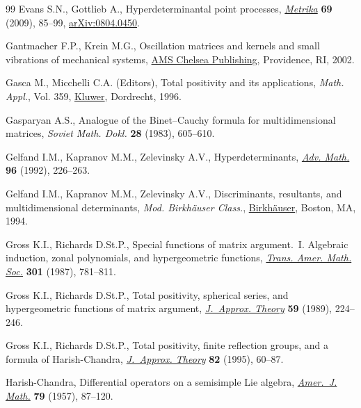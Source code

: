 \documentclass[10pt,a4paper]{amsart}
\numberwithin{equation}{section}
\begin{document}
\begin{thebibliography}{99}
Evans S.N., Gottlieb A., Hyperdeterminantal point processes,
 \href{https://doi.org/10.1007/s00184-008-0209-0}{\textit{Metrika}}
 \textbf{69} (2009), 85--99,
 \href{http://arxiv.org/abs/0804.0450}{arXiv:0804.0450}.

Gantmacher F.P., Krein M.G., Oscillation matrices and kernels and small
 vibrations of mechanical systems, \href{https://doi.org/10.1090/chel/345}{AMS
 Chelsea Publishing}, Providence, RI, 2002.

Gasca M., Micchelli C.A. (Editors), Total positivity and its applications,
 \textit{Math. Appl.}, Vol. 359,
 \href{https://doi.org/10.1007/978-94-015-8674-0}{Kluwer}, Dordrecht, 1996.

Gasparyan A.S., Analogue of the {B}inet--{C}auchy formula for multidimensional
 matrices, \textit{Soviet Math. Dokl.} \textbf{28} (1983), 605--610.

Gelfand I.M., Kapranov M.M., Zelevinsky A.V., Hyperdeterminants,
 \href{https://doi.org/10.1016/0001-8708(92)90056-Q}{\textit{Adv. Math.}}
 \textbf{96} (1992), 226--263.

Gelfand I.M., Kapranov M.M., Zelevinsky A.V., Discriminants, resultants, and
 multidimensional determinants, \textit{Mod. Birkh\"auser Class.},
 \href{https://doi.org/10.1007/978-0-8176-4771-1}{Birkh\"auser}, Boston, MA,
 1994.

Gross K.I., Richards D.St.P., Special functions of matrix argument.~{I}.
 {A}lgebraic induction, zonal polynomials, and hypergeometric functions,
 \href{https://doi.org/10.2307/2000670}{\textit{Trans. Amer. Math. Soc.}}
 \textbf{301} (1987), 781--811.

Gross K.I., Richards D.St.P., Total positivity, spherical series, and
 hypergeometric functions of matrix argument,
 \href{https://doi.org/10.1016/0021-9045(89)90153-6}{\textit{J.~Approx.
 Theory}} \textbf{59} (1989), 224--246.

Gross K.I., Richards D.St.P., Total positivity, finite reflection groups, and a
 formula of {H}arish-{C}handra,
 \href{https://doi.org/10.1006/jath.1995.1068}{\textit{J.~Approx. Theory}}
 \textbf{82} (1995), 60--87.

Harish-Chandra, Differential operators on a semisimple {L}ie algebra,
 \href{https://doi.org/10.2307/2372387}{\textit{Amer.~J. Math.}} \textbf{79}
 (1957), 87--120.


\end{thebibliography}
\end{document}
